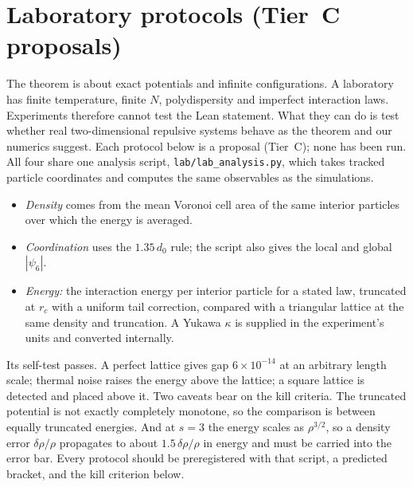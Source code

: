 \documentclass[11pt]{article}
\begin{document}
\section{Laboratory protocols (Tier~C proposals)}\label{sec:lab}
The theorem is about exact potentials and infinite configurations. A laboratory has finite temperature, finite $N$,
polydispersity and imperfect interaction laws. Experiments therefore cannot test the Lean statement. What they can do
is test whether real two-dimensional repulsive systems behave as the theorem and our numerics suggest. Each protocol
below is a proposal (Tier~C); none has been run. All four share one analysis script,
\texttt{lab/lab\_analysis.py}, which takes tracked particle coordinates and computes the same observables as the
simulations.
\begin{itemize}
\item \emph{Density} comes from the mean Voronoi cell area of the same interior particles over which the energy is
averaged.
\item \emph{Coordination} uses the $1.35\,d_0$ rule; the script also gives the local and global $|\psi_6|$.
\item \emph{Energy:} the interaction energy per interior particle for a stated law, truncated at $r_c$ with a uniform
tail correction, compared with a triangular lattice at the same density and truncation. A Yukawa $\kappa$ is supplied
in the experiment's units and converted internally.
\end{itemize}
Its self-test passes. A perfect lattice gives gap $6\times10^{-14}$ at an arbitrary length scale; thermal noise raises
the energy above the lattice; a square lattice is detected and placed above it. Two caveats bear on the kill criteria.
The truncated potential is not exactly completely monotone, so the comparison is between equally truncated energies.
And at $s=3$ the energy scales as $\rho^{3/2}$, so a density error $\delta\rho/\rho$ propagates to about
$1.5\,\delta\rho/\rho$ in energy and must be carried into the error bar. Every protocol should be preregistered with
that script, a predicted bracket, and the kill criterion below.
\end{document}
